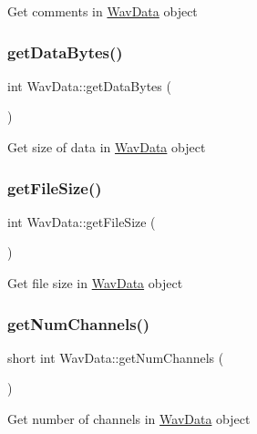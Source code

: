 Get comments in \hyperlink{classWavData}{Wav\+Data} object \mbox{\label{classWavData_a381c10a100d7f22f94f31d9e3343da43}} 
\subsubsection{\texorpdfstring{get\+Data\+Bytes()}{getDataBytes()}}
{\footnotesize\ttfamily int Wav\+Data\+::get\+Data\+Bytes (\begin{DoxyParamCaption}{ }\end{DoxyParamCaption})}

Get size of data in \hyperlink{classWavData}{Wav\+Data} object \mbox{\label{classWavData_af9da99964b711cf96006be88c4757ecb}} 
\subsubsection{\texorpdfstring{get\+File\+Size()}{getFileSize()}}
{\footnotesize\ttfamily int Wav\+Data\+::get\+File\+Size (\begin{DoxyParamCaption}{ }\end{DoxyParamCaption})}

Get file size in \hyperlink{classWavData}{Wav\+Data} object \mbox{\label{classWavData_a3b63c1ee83b868ae73402a09d916bb48}} 
\subsubsection{\texorpdfstring{get\+Num\+Channels()}{getNumChannels()}}
{\footnotesize\ttfamily short int Wav\+Data\+::get\+Num\+Channels (\begin{DoxyParamCaption}{ }\end{DoxyParamCaption})}

Get number of channels in \hyperlink{classWavData}{Wav\+Data} object \mbox{\label{classWavData_a5769f80ec72da1dc32e4d6debd4e5914}} 
